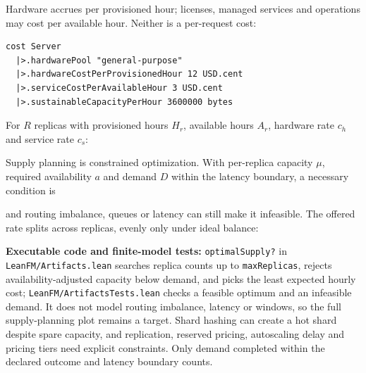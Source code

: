 Hardware accrues per provisioned hour; licenses, managed services and operations
may cost per available hour. Neither is a per-request cost:

\begin{lstlisting}
cost Server
  |>.hardwarePool "general-purpose"
  |>.hardwareCostPerProvisionedHour 12 USD.cent
  |>.serviceCostPerAvailableHour 3 USD.cent
  |>.sustainableCapacityPerHour 3600000 bytes
\end{lstlisting}

For $R$ replicas with provisioned hours $H_r$, available hours $A_r$, hardware
rate $c_h$ and service rate $c_s$:


Supply planning is constrained optimization. With per-replica capacity $\mu$,
required availability $a$ and demand $D$ within the latency boundary, a necessary
condition is


and routing imbalance, queues or latency can still make it infeasible. The
offered rate splits across replicas, evenly only under ideal balance:


\textbf{Executable code and finite-model tests:} \texttt{optimalSupply?} in
\texttt{LeanFM/Artifacts.lean} searches replica counts up to
\texttt{maxReplicas}, rejects availability-adjusted capacity below demand, and
picks the least expected hourly cost; \texttt{LeanFM/ArtifactsTests.lean} checks a
feasible optimum and an infeasible demand. It does not model routing imbalance,
latency or windows, so the full supply-planning plot remains a target. Shard
hashing can create a hot shard despite spare capacity, and replication, reserved
pricing, autoscaling delay and pricing tiers need explicit constraints. Only demand
completed within the declared outcome and latency boundary counts.

